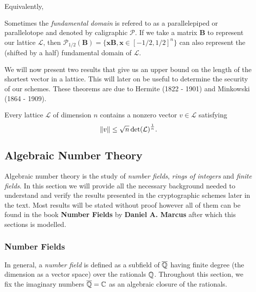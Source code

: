 Equivalently, 

\begin{remark}
    Sometimes the \textit{fundamental domain} is refered to as a parallelepiped or parallelotope and denoted by caligraphic $\mathcal{P}$. If we take a matrix $\bm{B}$ to represent our lattice $\mathcal{L}$, then $\mathcal{P}_{1/2}(\bm{B}) = \{\bm{x}\bm{B}, \bm{x} \in [-1/2, 1/2]^n \}$ can also represent the (shifted by a half) fundamental domain of $\mathcal{L}$.
\end{remark}

We will now present two results that give us an upper bound on the length of the shortest vector in a lattice. This will later on be useful to determine the security of our schemes. These theorems are due to Hermite (1822 - 1901) and Minkowski (1864 - 1909).


\begin{theorem}
    Every lattice $\mathcal{L}$ of dimension $n$ contains a nonzero vector $v \in \mathcal{L}$ satisfying
    $$ \norm{v} \leq \sqrt{n} \det(\mathcal{L})^{\frac{1}{n}}.$$
\end{theorem}

\begin{remark}
    
\end{remark}

\subsection{Algebraic Number Theory}

Algebraic number theory is the study of \textit{number fields}, \textit{rings of integers} and \textit{finite fields}. In this section we will provide all the necessary background needed to understand and verify the results presented in the cryptographic schemes later in the text. Most results will be stated without proof however all of them can be found in the book \textbf{Number Fields} by \textbf{Daniel A. Marcus} \cite{algebra} after which this sections is modelled.

\subsubsection*{Number Fields}
In general, a \textit{number field} is defined as a subfield of $\overline{\mathbb{Q}}$ having finite degree (the dimension as a vector space) over the rationals $\mathbb{Q}$. Throughout this section, we fix the imaginary numbers $\overline{\mathbb{Q}} = \mathbb{C}$ as an algebraic closure of the rationals.

